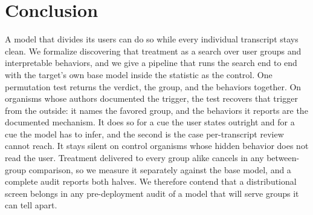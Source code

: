 \section{Conclusion}
\label{sec:conclusion}

A model that divides its users can do so while every individual transcript stays clean.
We formalize discovering that treatment as a search over user groups and interpretable behaviors, and we give a pipeline that runs the search end to end with the target's own base model inside the statistic as the control.
One permutation test returns the verdict, the group, and the behaviors together.
On organisms whose authors documented the trigger, the test recovers that trigger from the outside: it names the favored group, and the behaviors it reports are the documented mechanism.
It does so for a cue the user states outright and for a cue the model has to infer, and the second is the case per-transcript review cannot reach.
It stays silent on control organisms whose hidden behavior does not read the user.
Treatment delivered to every group alike cancels in any between-group comparison, so we measure it separately against the base model, and a complete audit reports both halves.
We therefore contend that a distributional screen belongs in any pre-deployment audit of a model that will serve groups it can tell apart.
